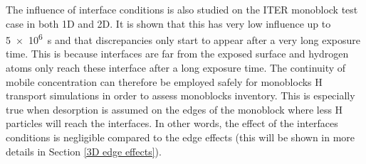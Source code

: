 The influence of interface conditions is also studied on the ITER monoblock test case in both 1D and 2D.
It is shown that this has very low influence up to \SI{5e6}{s} and that discrepancies only start to appear after a very long exposure time.
This is because interfaces are far from the exposed surface and hydrogen atoms only reach these interface after a long exposure time.
The continuity of mobile concentration can therefore be employed safely for monoblocks H transport simulations in order to assess monoblocks inventory.
This is especially true when desorption is assumed on the edges of the monoblock where less H particles will reach the interfaces.
In other words, the effect of the interfaces conditions is negligible compared to the edge effects (this will be shown in more details in Section \ref{3D edge effects}).
